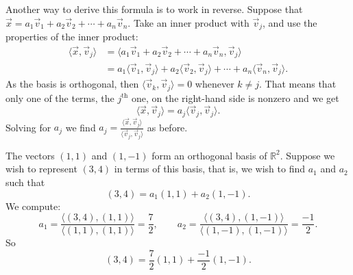 Another way to derive this formula is to work in reverse.  Suppose that
$\vec{x} =
a_1 \vec{v}_1 + 
a_2 \vec{v}_2 + \cdots +
a_n \vec{v}_n$.  Take an inner product with $\vec{v}_j$, and
use the properties of the inner product:
\begin{equation*}
\begin{split}
\langle \vec{x} , \vec{v}_j \rangle
& =
\langle a_1 \vec{v}_1 + 
a_2 \vec{v}_2 + \cdots +
a_n \vec{v}_n , \vec{v}_j \rangle
\\
& =
a_1 \langle \vec{v}_1 , \vec{v}_j \rangle + 
a_2 \langle \vec{v}_2 , \vec{v}_j \rangle + 
\cdots +
a_n \langle \vec{v}_n , \vec{v}_j \rangle .
\end{split}
\end{equation*}
As the basis is orthogonal, then
$\langle \vec{v}_k , \vec{v}_j \rangle = 0$ whenever
$k \not= j$.  That means that only one of the terms, the $j^{\text{th}}$ one,
on the right-hand side is nonzero and we get
\begin{equation*}
\langle \vec{x} , \vec{v}_j \rangle
=
a_j \langle \vec{v}_j , \vec{v}_j \rangle .
\end{equation*}
Solving for $a_j$ we find $a_j =
\frac{\langle \vec{x}, \vec{v}_j \rangle}{
\langle \vec{v}_j, \vec{v}_j \rangle
}$ as before.

\begin{example}
The vectors $(1,1)$ and $(1,-1)$ form an orthogonal basis of ${\mathbb{R}}^2$.
Suppose we wish to represent $(3,4)$ in terms of this basis,
that is, we wish to find $a_1$ and $a_2$ such that
\begin{equation*}
(3,4) = a_1 (1,1) + a_2 (1,-1) .
\end{equation*}
We compute:
\begin{equation*}
a_1 = 
\frac{\langle (3,4), (1,1) \rangle}{
\langle (1,1), (1,1) \rangle
}
=
\frac{7}{2}, \qquad
a_2 = 
\frac{\langle (3,4), (1,-1) \rangle}{
\langle (1,-1), (1,-1) \rangle
}
=
\frac{-1}{2} .
\end{equation*}
So
\begin{equation*}
(3,4) = \frac{7}{2} (1,1) + \frac{-1}{2} (1,-1) .
\end{equation*}
\end{example}

